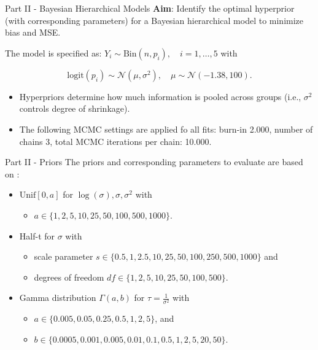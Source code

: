 \documentclass[
  ignorenonframetext,
  aspectratio=169]{beamer}
\providecommand{\tightlist}{%
  \setlength{\itemsep}{0pt}\setlength{\parskip}{0pt}}
\begin{document}
\begin{frame}{Part II - Bayesian Hierarchical Models}
\label{part-ii---bayesian-hierarchical-models-1}
\textbf{Aim}: Identify the optimal hyperprior (with corresponding
parameters) for a Bayesian hierarchical model to minimize bias and MSE.

The model is specified as:
\(Y_i \sim \mathrm{Bin}(n, p_i), \quad i = 1, \dots, 5\) with

\[ \mathrm{logit}(p_i) \sim \mathcal{N}(\mu, \sigma^2), \quad \mu \sim \mathcal{N}(-1.38, 100).\]

\begin{itemize}
\item
  Hyperpriors determine how much information is pooled across groups
  (i.e., \(\sigma^2\) controls degree of shrinkage).
\item
  The following MCMC settings are applied fo all fits: burn-in 2.000,
  number of chains 3, total MCMC iterations per chain: 10.000.
\end{itemize}
\end{frame}

\begin{frame}{Part II - Priors}
\label{part-ii---priors}
The priors and corresponding parameters to evaluate are based on
\citep{Cunanan}:

\begin{itemize}
\tightlist
\item
  \(\mathrm{Unif}[0, a]\) for \(\log(\sigma), \sigma, \sigma^2\) with

  \begin{itemize}
  \tightlist
  \item
    \(a \in \{1, 2, 5, 10, 25, 50, 100, 500, 1000\}\).
  \end{itemize}
\item
  Half-t for \(\sigma\) with

  \begin{itemize}
  \tightlist
  \item
    scale parameter
    \(s \in \{0.5, 1, 2.5, 10, 25, 50, 100, 250, 500, 1000\}\) and
  \item
    degrees of freedom \(df \in \{1, 2, 5, 10, 25, 50, 100, 500\}\).
  \end{itemize}
\item
  Gamma distribution \(\Gamma(a,b)\) for \(\tau = \frac{1}{\sigma^2}\)
  with

  \begin{itemize}
  \tightlist
  \item
    \(a \in \{0.005, 0.05, 0.25, 0.5, 1, 2, 5\}\), and
  \item
    \(b \in  \{0.0005, 0.001, 0.005, 0.01, 0.1, 0.5, 1, 2, 5, 20, 50\}\).
  \end{itemize}
\end{itemize}
\end{frame}
\end{document}

